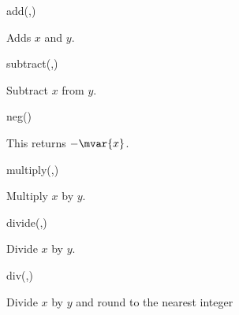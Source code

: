 \label{pgfmath-functions-basic}

\begin{math-function}{add(,)}
\mathcommand

  Adds $x$ and $y$.

\begin{codeexample}[]
 \pgfmathresult
\end{codeexample}
\end{math-function}

\begin{math-function}{subtract(,)}
\mathcommand

  Subtract $x$ from $y$.

\begin{codeexample}[]
 \pgfmathresult
\end{codeexample}
\end{math-function}

\begin{math-function}{neg()}
\mathcommand

	This returns $-\mvar{x}$.
	
\begin{codeexample}[]
 \pgfmathresult
\end{codeexample}

\end{math-function}

\begin{math-function}{multiply(,)}
\mathcommand

  Multiply $x$ by $y$.

\begin{codeexample}[]
 \pgfmathresult
\end{codeexample}
\end{math-function}

\begin{math-function}{divide(,)}
\mathcommand

  Divide $x$ by $y$.

\begin{codeexample}[]
 \pgfmathresult
\end{codeexample}
\end{math-function}

\begin{math-function}{div(,)}
\mathcommand

  Divide $x$ by $y$ and round to the nearest integer

\begin{codeexample}[]
 \pgfmathresult
\end{codeexample}
\end{math-function}


